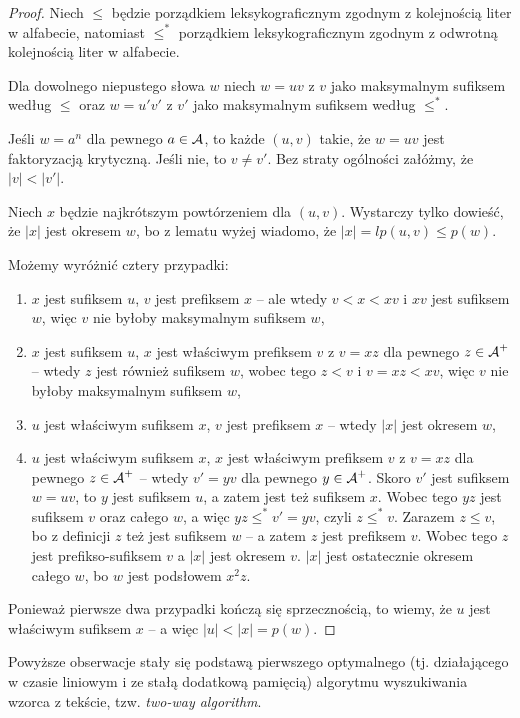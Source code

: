 \begin{proof}
  Niech $\le$ będzie porządkiem leksykograficznym zgodnym z kolejnością liter w alfabecie, natomiast $\le^*$ porządkiem leksykograficznym zgodnym z odwrotną kolejnością liter w alfabecie.

  Dla dowolnego niepustego słowa $w$ niech $w = uv$ z $v$ jako maksymalnym sufiksem według $\le$ oraz $w = u'v'$ z $v'$ jako maksymalnym sufiksem według $\le^*$.

  Jeśli $w = a^n$ dla pewnego $a \in \operatorname{\mathcal{A}}$, to każde $(u, v)$ takie, że $w = uv$ jest faktoryzacją krytyczną.
  Jeśli nie, to $v \neq v'$. Bez straty ogólności załóżmy, że $|v| < |v'|$.

  Niech $x$ będzie najkrótszym powtórzeniem dla $(u, v)$.
  Wystarczy tylko dowieść, że $|x|$ jest okresem $w$, bo z lematu wyżej wiadomo, że $|x| = lp(u, v) \le p(w)$.

  Możemy wyróżnić cztery przypadki:
  \begin{enumerate}
    \item $x$ jest sufiksem $u$, $v$ jest prefiksem $x$ -- ale wtedy $v < x < xv$ i $xv$ jest sufiksem $w$, więc $v$ nie byłoby maksymalnym sufiksem $w$,
    \item $x$ jest sufiksem $u$, $x$ jest właściwym prefiksem $v$ z $v = xz$ dla pewnego $z \in \operatorname{\mathcal{A}}^+$ -- wtedy $z$ jest również sufiksem $w$, wobec tego $z < v$ i $v = x z < x v$, więc $v$ nie byłoby maksymalnym sufiksem $w$,
    \item $u$ jest właściwym sufiksem $x$, $v$ jest prefiksem $x$ -- wtedy $|x|$ jest okresem $w$,
    \item $u$ jest właściwym sufiksem $x$, $x$ jest właściwym prefiksem $v$ z $v = x z$ dla pewnego $z \in \operatorname{\mathcal{A}}^+$ -- wtedy $v' = y v$ dla pewnego $y \in \operatorname{\mathcal{A}}^+$. Skoro $v'$ jest sufiksem $w = u v$, to $y$ jest sufiksem $u$, a zatem jest też sufiksem $x$. Wobec tego $y z$ jest sufiksem $v$ oraz całego $w$, a więc $y z \le^* v' = y v$, czyli $z \le^* v$. Zarazem $z \le v$, bo z definicji $z$ też jest sufiksem $w$ -- a zatem $z$ jest prefiksem $v$. Wobec tego $z$ jest prefikso-sufiksem $v$ a $|x|$ jest okresem $v$. $|x|$ jest ostatecznie okresem całego $w$, bo $w$ jest podsłowem $x^2 z$.
  \end{enumerate}

  Ponieważ pierwsze dwa przypadki kończą się sprzecznością, to wiemy, że $u$ jest właściwym sufiksem $x$ -- a więc $|u| < |x| = p(w)$.
\end{proof}

Powyższe obserwacje stały się podstawą pierwszego optymalnego (tj. działającego w czasie liniowym i ze stałą dodatkową pamięcią) algorytmu wyszukiwania wzorca z tekście, tzw. \emph{two-way algorithm}.

